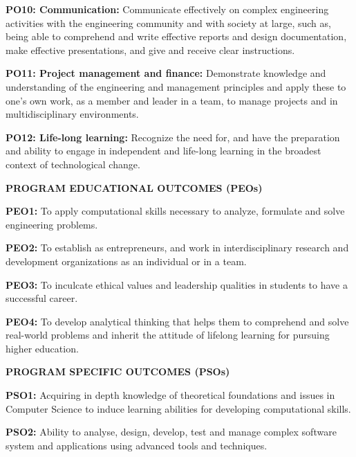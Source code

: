 \noindent\textbf{PO10: Communication:} Communicate effectively on complex engineering activities with the engineering community and with society at large, such as, being able to comprehend and write effective reports and design documentation, make effective presentations, and give and receive clear instructions.

\noindent\textbf{PO11: Project management and finance:} Demonstrate knowledge and understanding of the engineering and management principles and apply these to one's own work, as a member and leader in a team, to manage projects and in multidisciplinary environments.

\noindent\textbf{PO12: Life-long learning:} Recognize the need for, and have the preparation and ability to engage in independent and life-long learning in the broadest context of technological change.

\vspace{5mm}

\noindent\textbf{PROGRAM EDUCATIONAL OUTCOMES (PEOs)}

\noindent\textbf{PEO1:} To apply computational skills necessary to analyze, formulate and solve engineering problems.

\noindent\textbf{PEO2:} To establish as entrepreneurs, and work in interdisciplinary research and development organizations as an individual or in a team.

\noindent\textbf{PEO3:} To inculcate ethical values and leadership qualities in students to have a successful career.

\noindent\textbf{PEO4:} To develop analytical thinking that helps them to comprehend and solve real-world problems and inherit the attitude of lifelong learning for pursuing higher education.

\vspace{5mm}

\noindent\textbf{PROGRAM SPECIFIC OUTCOMES (PSOs)}

\noindent\textbf{PSO1:} Acquiring in depth knowledge of theoretical foundations and issues in Computer Science to induce learning abilities for developing computational skills.

\noindent\textbf{PSO2:} Ability to analyse, design, develop, test and manage complex software system and applications using advanced tools and techniques.
